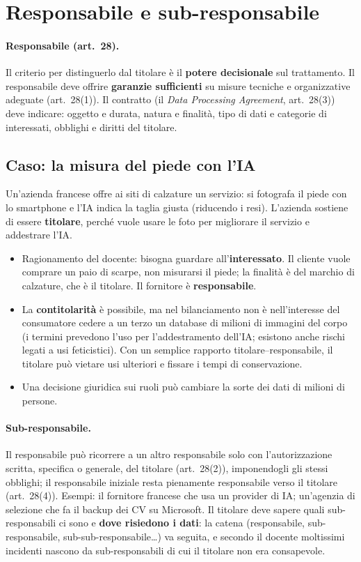 \section{Responsabile e sub-responsabile}
\paragraph{Responsabile (art.~28).} Il criterio per distinguerlo dal titolare è il \textbf{potere
decisionale} sul trattamento. Il responsabile deve offrire \textbf{garanzie sufficienti} su misure
tecniche e organizzative adeguate (art.~28(1)). Il contratto (il \emph{Data Processing Agreement},
art.~28(3)) deve indicare: oggetto e durata, natura e finalità, tipo di dati e categorie di
interessati, obblighi e diritti del titolare.

\subsection{Caso: la misura del piede con l'IA}
Un'azienda francese offre ai siti di calzature un servizio: si fotografa il piede con lo smartphone e
l'IA indica la taglia giusta (riducendo i resi). L'azienda sostiene di essere \textbf{titolare}, perché
vuole usare le foto per migliorare il servizio e addestrare l'IA.
\begin{itemize}
  \item Ragionamento del docente: bisogna guardare all'\textbf{interessato}. Il cliente vuole comprare
    un paio di scarpe, non misurarsi il piede; la finalità è del marchio di calzature, che è il
    titolare. Il fornitore è \textbf{responsabile}.
  \item La \textbf{contitolarità} è possibile, ma nel bilanciamento non è nell'interesse del
    consumatore cedere a un terzo un database di milioni di immagini del corpo (i termini prevedono
    l'uso per l'addestramento dell'IA; esistono anche rischi legati a usi feticistici). Con un semplice
    rapporto titolare--responsabile, il titolare può vietare usi ulteriori e fissare i tempi di
    conservazione.
  \item Una decisione giuridica sui ruoli può cambiare la sorte dei dati di milioni di persone.
\end{itemize}

\paragraph{Sub-responsabile.} Il responsabile può ricorrere a un altro responsabile solo con
l'autorizzazione scritta, specifica o generale, del titolare (art.~28(2)), imponendogli gli stessi
obblighi; il responsabile iniziale resta pienamente responsabile verso il titolare (art.~28(4)).
Esempi: il fornitore francese che usa un provider di IA; un'agenzia di selezione che fa il backup dei
CV su Microsoft. Il titolare deve sapere quali sub-responsabili ci sono e \textbf{dove risiedono i
dati}: la catena (responsabile, sub-responsabile, sub-sub-responsabile\ldots) va seguita, e secondo il
docente moltissimi incidenti nascono da sub-responsabili di cui il titolare non era consapevole.

